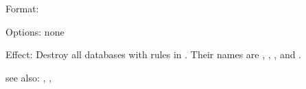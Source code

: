 
Format: 

Options: none

Effect:  Destroy all databases with rules in \FORWARD{}. Their names are 
         , , ,  
	 and .

see also: \consult, \destroy, \replace 

